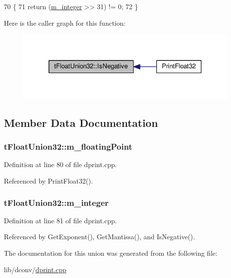 \begin{DoxyCode}
70                              \{
71         \textcolor{keywordflow}{return} (\hyperlink{uniontFloatUnion32_af3cba3a9212a20888a1a1a6848bd5c26}{m\_integer} >> 31) != 0;
72     \}
\end{DoxyCode}


Here is the caller graph for this function\+:\nopagebreak
\begin{figure}[H]
\begin{center}
\leavevmode
\includegraphics[width=316pt]{uniontFloatUnion32_a712fc8a147092d725afef356b58e222d_icgraph}
\end{center}
\end{figure}




\subsection{Member Data Documentation}
\subsubsection[{\texorpdfstring{m\+\_\+floating\+Point}{m_floatingPoint}}]{ t\+Float\+Union32\+::m\+\_\+floating\+Point}\hypertarget{uniontFloatUnion32_ad1a5322bcde302e59bcd001125651e6a}{}\label{uniontFloatUnion32_ad1a5322bcde302e59bcd001125651e6a}


Definition at line 80 of file dprint.\+cpp.



Referenced by Print\+Float32().

\subsubsection[{\texorpdfstring{m\+\_\+integer}{m_integer}}]{ t\+Float\+Union32\+::m\+\_\+integer}\hypertarget{uniontFloatUnion32_af3cba3a9212a20888a1a1a6848bd5c26}{}\label{uniontFloatUnion32_af3cba3a9212a20888a1a1a6848bd5c26}


Definition at line 81 of file dprint.\+cpp.



Referenced by Get\+Exponent(), Get\+Mantissa(), and Is\+Negative().



The documentation for this union was generated from the following file\+:\begin{DoxyCompactItemize}
\item 
lib/dconv/\hyperlink{dprint_8cpp}{dprint.\+cpp}\end{DoxyCompactItemize}
